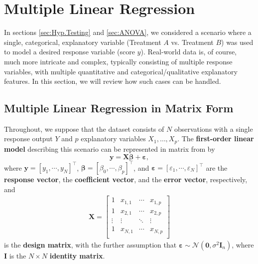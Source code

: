 
\section{Multiple Linear Regression}\label{sec:MLR}
In sections \ref{sec:Hyp.Testing} and \ref{sec:ANOVA}, we considered a scenario where a single, categorical, explanatory variable (Treatment $A$ vs. Treatment $B$) was used to model a desired response variable (score $y$). Real-world data is, of course, much more intricate and complex, typically consisting of multiple response variables, with multiple quantitative and categorical/qualitative explanatory features. In this section, we will review how such cases can be handled.

\subsection{Multiple Linear Regression in Matrix Form}
Throughout, we suppose that the dataset consists of $N$ observations with a single response output $Y$ and $p$ explanatory variables $X_1,\ldots,X_p$. The \textbf{first-order linear model} describing this scenario can be represented in matrix from by 
\begin{equation}\label{eq:MLR}
    \bm{y}=\bm{X\beta}+\bm{\varepsilon},
\end{equation}
where $\bm{y}=[y_{1},\cdots,y_{N}]^{\!\top}$, $\bm{\beta}=[\beta_{0},\cdots,\beta_{p}]^{\!\top}$, and $\bm{\varepsilon}=[\varepsilon_{1},\cdots,\varepsilon_{N}]^{\!\top}$ are the \textbf{response vector},  the \textbf{coefficient vector}, and  the \textbf{error vector}, respectively, and 
\begin{gather*}
 \bm{X} =  
    \begin{bmatrix}
    1 & x_{1,1} & \cdots & x_{1,p}\\
    1 & x_{2,1} & \cdots & x_{2,p}\\
    \vdots & \vdots & \ddots & \vdots\\
    1 & x_{N,1} & \cdots & x_{N,p}\\
    \end{bmatrix}  
\end{gather*}
is the \textbf{design matrix}, with the further assumption that $\bm{\varepsilon}\sim \mathcal{N}(\bm{0}, \sigma^{2}\bm{I}_n)$, where $\bm{I}$ is the $N \times N$ \textbf{identity matrix}. 

